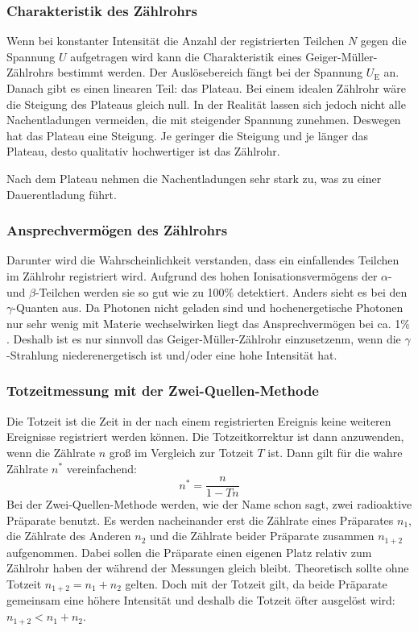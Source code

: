 \documentclass[titlepage = firstcover]{scrartcl}
\begin{document}
        \subsubsection{Charakteristik des Zählrohrs}
          Wenn bei konstanter Intensität die Anzahl der registrierten Teilchen $N$ gegen die Spannung $U$ aufgetragen wird kann die Charakteristik eines Geiger-Müller-Zählrohrs bestimmt werden. Der Auslösebereich fängt bei der Spannung $U_{\text{E}}$ an. Danach gibt es einen linearen Teil: das Plateau. Bei einem idealen Zählrohr wäre die Steigung des Plateaus gleich null. In der Realität lassen sich jedoch nicht alle Nachentladungen vermeiden, die mit steigender Spannung zunehmen. Deswegen hat das Plateau eine Steigung. Je geringer die Steigung und je länger das Plateau, desto qualitativ hochwertiger ist das Zählrohr.

          Nach dem Plateau nehmen die Nachentladungen sehr stark zu, was zu einer Dauerentladung führt.

        \subsubsection{Ansprechvermögen des Zählrohrs}
          Darunter wird die Wahrscheinlichkeit verstanden, dass ein einfallendes Teilchen im Zählrohr registriert wird. Aufgrund des hohen Ionisationsvermögens der $\alpha$- und $\beta$-Teilchen werden sie so gut wie zu 100$\%$ detektiert. Anders sieht es bei den $\gamma$-Quanten aus. Da Photonen nicht geladen sind und hochenergetische Photonen nur sehr wenig mit Materie wechselwirken liegt das Ansprechvermögen bei ca. 1$\%$. Deshalb ist es nur sinnvoll das Geiger-Müller-Zählrohr einzusetzenm, wenn die $\gamma$-Strahlung niederenergetisch ist und/oder eine hohe Intensität hat.

        \subsubsection{Totzeitmessung mit der Zwei-Quellen-Methode}
          Die Totzeit ist die Zeit in der nach einem registrierten Ereignis keine weiteren Ereignisse registriert werden können. Die Totzeitkorrektur ist dann anzuwenden, wenn die Zählrate $n$ groß im Vergleich zur Totzeit $T$ ist. Dann gilt für die wahre Zählrate $n^*$ vereinfachend:
          \begin{equation}
            n^* = \frac{n}{1 - T n}
            \label{eqn:totzeit}
          \end{equation}
          Bei der Zwei-Quellen-Methode werden, wie der Name schon sagt, zwei radioaktive Präparate benutzt. Es werden nacheinander erst die Zählrate eines Präparates $n_1$, die Zählrate des Anderen $n_2$ und die Zählrate beider Präparate zusammen $n_{1+2}$ aufgenommen. Dabei sollen die Präparate einen eigenen Platz relativ zum Zählrohr haben der während der Messungen gleich bleibt. Theoretisch sollte ohne Totzeit $n_{1+2} = n_1 + n_2$ gelten. Doch mit der Totzeit gilt, da beide Präparate gemeinsam eine höhere Intensität und deshalb die Totzeit öfter ausgelöst wird:  $n_{1+2} < n_1 + n_2$.
\end{document}

